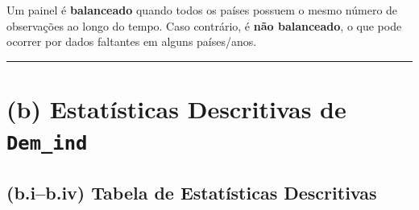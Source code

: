 \documentclass[
  portuguese,
  letterpaper,
  DIV=11,
  numbers=noendperiod]{scrartcl}
\begin{document}
Um painel é \textbf{balanceado} quando todos os países possuem o mesmo
número de observações ao longo do tempo. Caso contrário, é \textbf{não
balanceado}, o que pode ocorrer por dados faltantes em alguns
países/anos.

\begin{center}\rule{0.5\linewidth}{0.5pt}\end{center}

\section{\texorpdfstring{(b) Estatísticas Descritivas de
\texttt{Dem\_ind}}{(b) Estatísticas Descritivas de Dem\_ind}}\label{b-estatuxedsticas-descritivas-de-dem_ind}

\subsection{(b.i--b.iv) Tabela de Estatísticas
Descritivas}\label{b.ib.iv-tabela-de-estatuxedsticas-descritivas}
\end{document}
